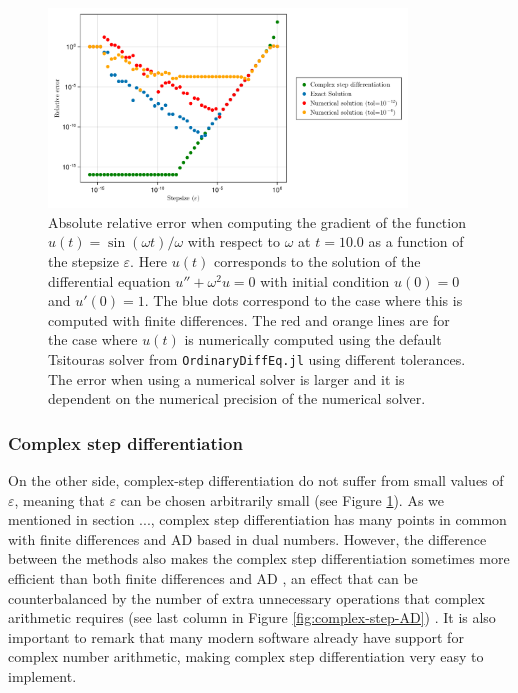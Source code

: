 \begin{figure}[tbh]
    \centering
    \includegraphics[width=0.85\textwidth]{../code/finite_differences/finite_difference_derivative.pdf}
    \caption{Absolute relative error when computing the gradient of the function $u(t) = \sin (\omega t)/\omega$ with respect to $\omega$ at $t=10.0$ as a function of the stepsize $\varepsilon$. Here $u(t)$ corresponds to the solution of the differential equation $u'' + \omega^2 u = 0$ with initial condition $u(0)=0$ and $u'(0)=1$. The blue dots correspond to the case where this is computed with finite differences. The red and orange lines are for the case where $u(t)$ is numerically computed using the default Tsitouras solver \cite{Tsitouras_2011} from \texttt{OrdinaryDiffEq.jl} using different tolerances. The error when using a numerical solver is larger and it is dependent on the numerical precision of the numerical solver. }
    \label{fig:finite-diff}
\end{figure}

\subsubsection{Complex step differentiation}

On the other side, complex-step differentiation do not suffer from small values of $\varepsilon$, meaning that $\varepsilon$ can be chosen arbitrarily small (see Figure \ref{fig:finite-diff}). 
As we mentioned in section ..., complex step differentiation has many points in common with finite differences and AD based in dual numbers. 
However, the difference between the methods also makes the complex step differentiation sometimes more efficient than both finite differences and AD \cite{Lantoine_Russell_Dargent_2012}, an effect that can be counterbalanced by the number of extra unnecessary operations that complex arithmetic requires (see last column in Figure \ref{fig:complex-step-AD}) \cite{Martins_Sturdza_Alonso_2003_complex_differentiation}.
It is also important to remark that many modern software already have support for complex number arithmetic, making complex step differentiation very easy to implement.


